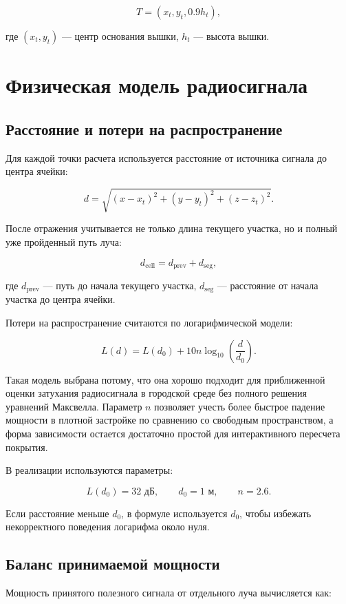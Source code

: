 \documentclass[12pt,a4paper]{article}
\begin{document}
\[
T = (x_t, y_t, 0.9h_t),
\]

где $(x_t, y_t)$ --- центр основания вышки, $h_t$ --- высота вышки.

\section{Физическая модель радиосигнала}

\subsection{Расстояние и потери на распространение}

Для каждой точки расчета используется расстояние от источника сигнала до центра ячейки:

\[
d = \sqrt{(x - x_t)^2 + (y - y_t)^2 + (z - z_t)^2}.
\]

После отражения учитывается не только длина текущего участка, но и полный уже пройденный путь луча:

\[
d_{\text{cell}} = d_{\text{prev}} + d_{\text{seg}},
\]

где $d_{\text{prev}}$ --- путь до начала текущего участка, $d_{\text{seg}}$ --- расстояние от начала участка до центра ячейки.

Потери на распространение считаются по логарифмической модели:

\[
L(d) = L(d_0) + 10n\log_{10}\left(\frac{d}{d_0}\right).
\]

Такая модель выбрана потому, что она хорошо подходит для приближенной оценки затухания радиосигнала в городской среде без полного решения уравнений Максвелла. Параметр $n$ позволяет учесть более быстрое падение мощности в плотной застройке по сравнению со свободным пространством, а форма зависимости остается достаточно простой для интерактивного пересчета покрытия.

В реализации используются параметры:

\[
L(d_0) = 32\text{ дБ}, \qquad d_0 = 1\text{ м}, \qquad n = 2.6.
\]

Если расстояние меньше $d_0$, в формуле используется $d_0$, чтобы избежать некорректного поведения логарифма около нуля.

\subsection{Баланс принимаемой мощности}

Мощность принятого полезного сигнала от отдельного луча вычисляется как:
\end{document}
